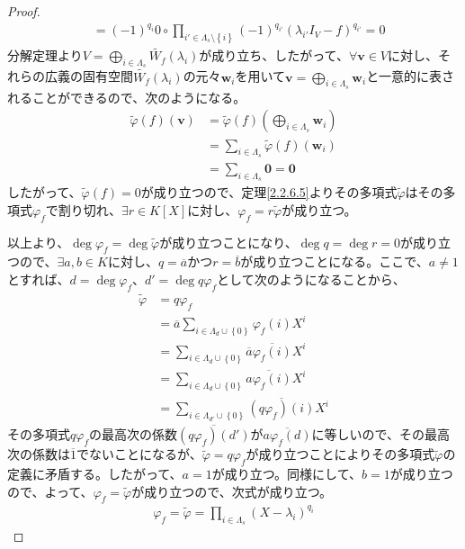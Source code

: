 \documentclass[dvipdfmx]{jsarticle}
\begin{document}
\begin{proof}
\begin{align*}
&= ( - 1)^{q_{i}}0 \circ \prod_{i' \in \varLambda_{s} \setminus \left\{ i \right\}} {( - 1)^{q_{i'}}\left( \lambda_{i'}I_{V} - f \right)^{q_{i'}}} = 0
\end{align*}
分解定理より$V = \bigoplus_{i \in \varLambda_{s}} {\widetilde{W_{f}}\left( \lambda_{i} \right)}$が成り立ち、したがって、$\forall\mathbf{v} \in V$に対し、それらの広義の固有空間$\widetilde{W_{f}}\left( \lambda_{i} \right)$の元々$\mathbf{w}_{i}$を用いて$\mathbf{v} = \bigoplus_{i \in \varLambda_{s}} \mathbf{w}_{i}$と一意的に表されることができるので、次のようになる。
\begin{align*}
\widetilde{\varphi}(f)\left( \mathbf{v} \right) &= \widetilde{\varphi}(f)\left( \bigoplus_{i \in \varLambda_{s}} \mathbf{w}_{i} \right)\\
&= \sum_{i \in \varLambda_{s}} {\widetilde{\varphi}(f)\left( \mathbf{w}_{i} \right)}\\
&= \sum_{i \in \varLambda_{s}} \mathbf{0} = \mathbf{0}
\end{align*}
したがって、$\widetilde{\varphi}(f) = 0$が成り立つので、定理\ref{2.2.6.5}よりその多項式$\widetilde{\varphi}$はその多項式$\varphi_{f}$で割り切れ、$\exists r \in K[ X]$に対し、$\varphi_{f} = r\widetilde{\varphi}$が成り立つ。\par
以上より、$\deg{\varphi_{f}} = \deg{\widetilde{\varphi}}$が成り立つことになり、$\deg{q} = \deg{r} = 0$が成り立つので、$\exists a,b \in K$に対し、$q = \overline{a}$かつ$r = \overline{b}$が成り立つことになる。ここで、$a \neq 1$とすれば、$d = \deg{\varphi_{f}}$、$d' = \deg{q\varphi_{f}}$として次のようになることから、
\begin{align*}
\widetilde{\varphi} &= q\varphi_{f}\\
&= \overline{a}\sum_{i \in \varLambda_{d} \cup \left\{ 0 \right\}} {\varphi_{f}(i)X^{i}}\\
&= \sum_{i \in \varLambda_{d} \cup \left\{ 0 \right\}} {\overline{a}\overline{\varphi_{f}(i)}X^{i}}\\
&= \sum_{i \in \varLambda_{d} \cup \left\{ 0 \right\}} {\overline{a\varphi_{f}(i)}X^{i}}\\
&= \sum_{i \in \varLambda_{d'} \cup \left\{ 0 \right\}} {\overline{\left( q\varphi_{f} \right)(i)}X^{i}}
\end{align*}
その多項式$q\varphi_{f}$の最高次の係数$\overline{\left( q\varphi_{f} \right)\left( d' \right)}$が$\overline{a\varphi_{f}(d)}$に等しいので、その最高次の係数は$\overline{1}$でないことになるが、$\widetilde{\varphi} = q\varphi_{f}$が成り立つことによりその多項式$\widetilde{\varphi}$の定義に矛盾する。したがって、$a = 1$が成り立つ。同様にして、$b = 1$が成り立つので、よって、$\varphi_{f} = \widetilde{\varphi}$が成り立つので、次式が成り立つ。
\begin{align*}
\varphi_{f} = \widetilde{\varphi} = \prod_{i \in \varLambda_{s}} \left( X - \lambda_{i} \right)^{q_{i}}
\end{align*}
\end{proof}
\end{document}

